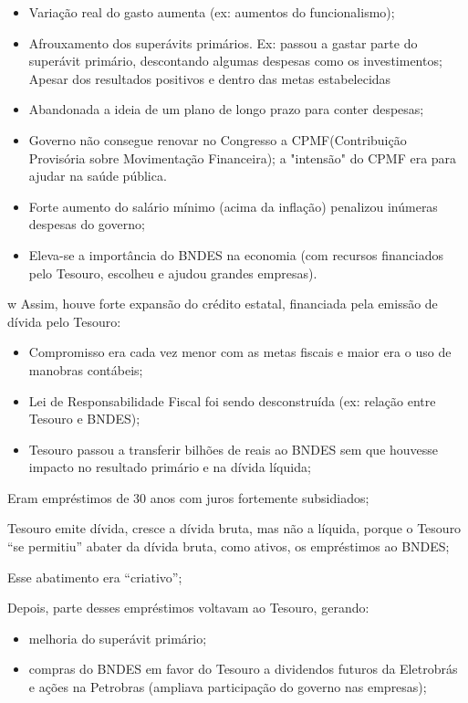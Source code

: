 \documentclass[a4paper,12pt]{article}[abntex2]
\begin{document}
\begin{itemize}
    \item Variação real do gasto aumenta (ex: aumentos do funcionalismo);
    \item Afrouxamento dos superávits primários. Ex: passou a gastar parte do superávit primário, descontando algumas despesas como os investimentos; Apesar dos resultados positivos e dentro das metas estabelecidas
    \item Abandonada a ideia de um plano de longo prazo para conter despesas;
    \item Governo não consegue renovar no Congresso a CPMF(Contribuição Provisória sobre Movimentação Financeira); a "intensão" do CPMF era para ajudar na saúde pública.
    \item Forte aumento do salário mínimo (acima da inflação) penalizou inúmeras despesas do governo;
    \item Eleva-se a importância do BNDES na economia (com recursos financiados pelo Tesouro, escolheu e ajudou grandes empresas).
\end{itemize}
w
Assim, houve forte expansão do crédito estatal, financiada pela emissão de dívida pelo Tesouro:

\begin{itemize}
    \item Compromisso era cada vez menor com as metas fiscais e maior era o uso de manobras contábeis;
    \item Lei de Responsabilidade Fiscal foi sendo desconstruída (ex: relação entre Tesouro e BNDES);
    \item Tesouro passou a transferir bilhões de reais ao BNDES sem que houvesse impacto no resultado primário e na dívida líquida;
\end{itemize}

Eram empréstimos de 30 anos com juros fortemente subsidiados;

Tesouro emite dívida, cresce a dívida bruta, mas não a líquida, porque o Tesouro ``se permitiu'' abater da dívida bruta, como ativos, os empréstimos ao BNDES;

Esse abatimento era ``criativo'';

Depois, parte desses empréstimos voltavam ao Tesouro, gerando:
    \begin{itemize}
        \item melhoria do superávit primário;
        \item compras do BNDES em favor do Tesouro a dividendos futuros da Eletrobrás e ações na Petrobras (ampliava participação do governo nas empresas);
    \end{itemize}
\end{document}
